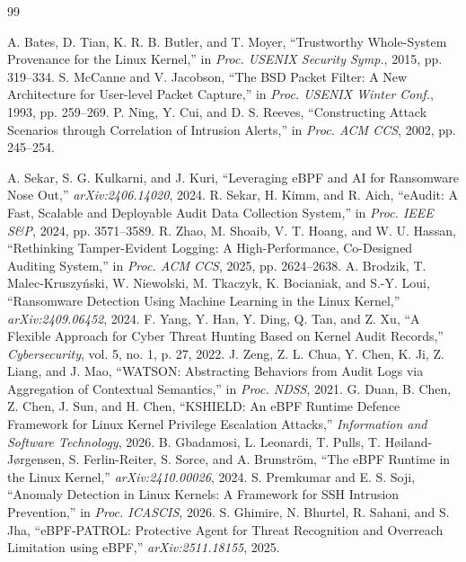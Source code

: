 \documentclass[conference]{IEEEtran}
\begin{document}
\begin{thebibliography}{99}
\footnotesize

 A. Bates, D. Tian, K. R. B. Butler, and T. Moyer, ``Trustworthy Whole-System Provenance for the Linux Kernel,'' in \emph{Proc. USENIX Security Symp.}, 2015, pp. 319--334.
 S. McCanne and V. Jacobson, ``The BSD Packet Filter: A New Architecture for User-level Packet Capture,'' in \emph{Proc. USENIX Winter Conf.}, 1993, pp. 259--269.
 P. Ning, Y. Cui, and D. S. Reeves, ``Constructing Attack Scenarios through Correlation of Intrusion Alerts,'' in \emph{Proc. ACM CCS}, 2002, pp. 245--254.

 A. Sekar, S. G. Kulkarni, and J. Kuri, ``Leveraging eBPF and AI for Ransomware Nose Out,'' \emph{arXiv:2406.14020}, 2024.
 R. Sekar, H. Kimm, and R. Aich, ``eAudit: A Fast, Scalable and Deployable Audit Data Collection System,'' in \emph{Proc. IEEE S\&P}, 2024, pp. 3571--3589.
 R. Zhao, M. Shoaib, V. T. Hoang, and W. U. Hassan, ``Rethinking Tamper-Evident Logging: A High-Performance, Co-Designed Auditing System,'' in \emph{Proc. ACM CCS}, 2025, pp. 2624--2638.
 A. Brodzik, T. Malec-Kruszy\'{n}ski, W. Niewolski, M. Tkaczyk, K. Bocianiak, and S.-Y. Loui, ``Ransomware Detection Using Machine Learning in the Linux Kernel,'' \emph{arXiv:2409.06452}, 2024.
 F. Yang, Y. Han, Y. Ding, Q. Tan, and Z. Xu, ``A Flexible Approach for Cyber Threat Hunting Based on Kernel Audit Records,'' \emph{Cybersecurity}, vol. 5, no. 1, p. 27, 2022.
 J. Zeng, Z. L. Chua, Y. Chen, K. Ji, Z. Liang, and J. Mao, ``WATSON: Abstracting Behaviors from Audit Logs via Aggregation of Contextual Semantics,'' in \emph{Proc. NDSS}, 2021.
 G. Duan, B. Chen, Z. Chen, J. Sun, and H. Chen, ``KSHIELD: An eBPF Runtime Defence Framework for Linux Kernel Privilege Escalation Attacks,'' \emph{Information and Software Technology}, 2026.
 B. Gbadamosi, L. Leonardi, T. Pulls, T. H{\o}iland-J{\o}rgensen, S. Ferlin-Reiter, S. Sorce, and A. Brunstr\"{o}m, ``The eBPF Runtime in the Linux Kernel,'' \emph{arXiv:2410.00026}, 2024.
 S. Premkumar and E. S. Soji, ``Anomaly Detection in Linux Kernels: A Framework for SSH Intrusion Prevention,'' in \emph{Proc. ICASCIS}, 2026.
 S. Ghimire, N. Bhurtel, R. Sahani, and S. Jha, ``eBPF-PATROL: Protective Agent for Threat Recognition and Overreach Limitation using eBPF,'' \emph{arXiv:2511.18155}, 2025.


\end{thebibliography}
\end{document}
